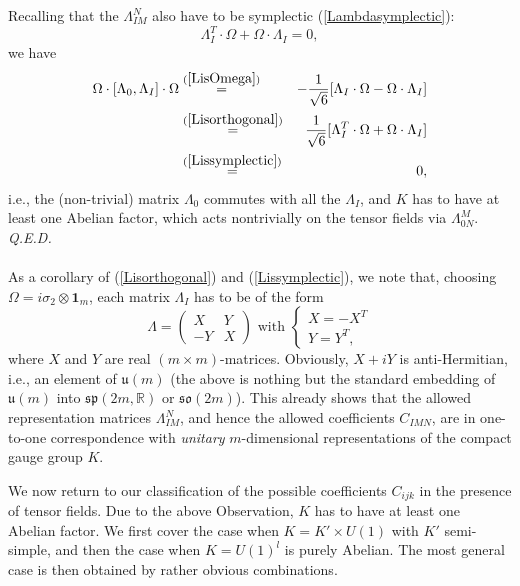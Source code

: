 \documentclass[a4paper,11pt]{article}
\begin{document}
Recalling that the
 $\Lambda_{IM}^{N}$ also have to be symplectic (\ref{Lambdasymplectic}):
\begin{equation}\label{Lissymplectic}
\Lambda_{I}^{T}\cdot\Omega +\Omega \cdot \Lambda_{I}=0,
\end{equation}
we have
\begin{eqnarray*}
\Omega\cdot
[\Lambda_{0},\Lambda_{I}]\cdot\Omega&\stackrel{(\ref{LisOmega})}{=}&-
\frac{1}{
\sqrt{6}}
[\Lambda_{I}\cdot \Omega-\Omega\cdot\Lambda_{I}]\\
&\stackrel{(\ref{Lisorthogonal})}{=}& 
\frac{1}{\sqrt{6}}[\Lambda_{I}^{T}\cdot\Omega +\Omega \cdot \Lambda_{I}]\\
&\stackrel{(\ref{Lissymplectic})}{=}&0,
\end{eqnarray*}
i.e., the (non-trivial) matrix $\Lambda_{0}$ commutes with all the
$\Lambda_{I}$, and $K$ has to have at least one Abelian factor,
which acts nontrivially on the tensor fields via
$\Lambda_{0N}^{M}$.
\hfill \emph{Q.E.D.}\\
\vspace{1mm}\\

As a corollary of (\ref{Lisorthogonal}) and
(\ref{Lissymplectic}), we note that, choosing
$\Omega=i\sigma_{2}\otimes \mathbf{1}_{m}$, each matrix
$\Lambda_{I}$ has to be of the form
\begin{equation}\label{Lambdamatrix}
\Lambda=\left(
\begin{array}{cc}
X&Y\\
-Y&X
\end{array}\right)\textrm{ with } \left\{
\begin{array}{c}
X=-X^{T}\\
Y=Y^{T},
\end{array}\right.
\end{equation}
where $X$ and $Y$ are real $(m\times m)$-matrices. Obviously,
$X+iY$ is anti-Hermitian, i.e., an element of $\mathfrak{u}(m)$
(the above is nothing but the standard embedding of
$\mathfrak{u}(m)$ into $\mathfrak{sp}(2m,\mathbb{R})$ or
$\mathfrak{so}(2m)$). This already shows that
the allowed representation matrices
$\Lambda_{IM}^{N}$, and hence the allowed coefficients
$C_{IMN}$, are in one-to-one correspondence with \emph{unitary}
$m$-dimensional representations of the compact gauge group $K$.

We now return to our classification of the possible
coefficients $C_{ijk}$ in the presence of tensor fields. Due to
the above Observation, $K$ has to have at least one Abelian
factor. We first cover the case when $K=K'\times U(1)$ with
$K'$ semi-simple, and then the case when $K=U(1)^{l}$ is purely
Abelian. The most general case is then obtained by rather obvious
combinations.
\end{document}
